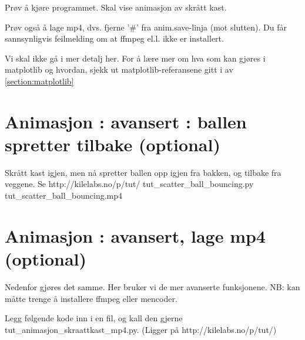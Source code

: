 Prøv å kjøre programmet. Skal vise animasjon av skrått kast. 

Prøv også å lage mp4, dvs. fjerne '\#' fra anim.save-linja (mot slutten). Du får sannsynligvis feilmelding om at ffmpeg el.l. ikke er installert. 

Vi skal ikke gå i mer detalj her. For å lære mer om hva som kan gjøres i matplotlib og hvordan, sjekk ut matplotlib-referansene gitt i av \ref{section:matplotlib}

\section{Animasjon : avansert : ballen spretter tilbake  (optional)}

Skrått kast igjen, men nå spretter ballen opp igjen fra bakken, og tilbake fra veggene. Se http://kilelabs.no/p/tut/
tut\_{}scatter\_{}ball\_{}bouncing.py
tut\_{}scatter\_{}ball\_{}bouncing.mp4

\section{Animasjon : avansert, lage mp4 (optional)}

Nedenfor gjøres det samme. Her bruker vi de mer avanserte funksjonene. NB: kan måtte trenge å installere ffmpeg eller mencoder. 

Legg følgende kode inn i en fil, og kall den gjerne tut\_{}animasjon\_{}skraattkast\_{}mp4.py. (Ligger på http://kilelabs.no/p/tut/)

